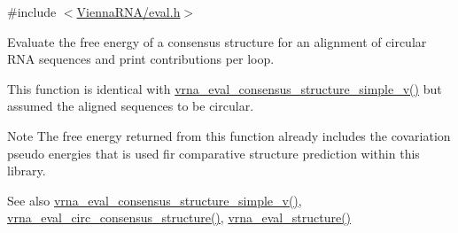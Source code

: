 {\ttfamily \#include $<$\mbox{\hyperlink{eval_8h}{Vienna\+R\+N\+A/eval.\+h}}$>$}



Evaluate the free energy of a consensus structure for an alignment of circular R\+NA sequences and print contributions per loop. 

This function is identical with \mbox{\hyperlink{group__eval_gad88927c62ab0a8b534e078e44be1b36e}{vrna\+\_\+eval\+\_\+consensus\+\_\+structure\+\_\+simple\+\_\+v()}} but assumed the aligned sequences to be circular.

\begin{DoxyNote}{Note}
The free energy returned from this function already includes the covariation pseudo energies that is used fir comparative structure prediction within this library.
\end{DoxyNote}
\begin{DoxySeeAlso}{See also}
\mbox{\hyperlink{group__eval_gad88927c62ab0a8b534e078e44be1b36e}{vrna\+\_\+eval\+\_\+consensus\+\_\+structure\+\_\+simple\+\_\+v()}}, \mbox{\hyperlink{group__eval_gac96577cf232c71160f762737a994b7c6}{vrna\+\_\+eval\+\_\+circ\+\_\+consensus\+\_\+structure()}}, \mbox{\hyperlink{group__eval_ga58f199f1438d794a265f3b27fc8ea631}{vrna\+\_\+eval\+\_\+structure()}}
\end{DoxySeeAlso}

